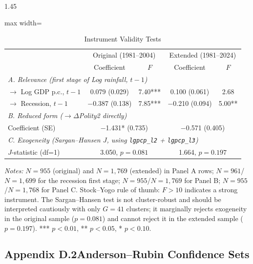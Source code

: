 \documentclass[12pt]{article}
\begin{document}
\begin{bibunit}[jpe]
\begin{spacing}{1.45}
\begin{table}[H]
\centering
\begin{adjustbox}{max width=\textwidth}
\begin{threeparttable}
\caption{Instrument Validity Tests}
\label{tab:D1}
\begin{tabular}{lcccc}
\toprule
 & \multicolumn{2}{c}{Original (1981--2004)} & \multicolumn{2}{c}{Extended (1981--2024)} \\
 & Coefficient & $F$ & Coefficient & $F$ \\
\midrule
\multicolumn{5}{l}{\textit{A. Relevance (first stage of Log rainfall, $t-1$)}} \\
$\to$ Log GDP p.c., $t-1$   & 0.079 (0.029) & 7.40*** & 0.100 (0.061) & 2.68 \\
$\to$ Recession, $t-1$      & $-$0.387 (0.138) & 7.85*** & $-$0.210 (0.094) & 5.00** \\
\midrule
\multicolumn{5}{l}{\textit{B. Reduced form ($\to\Delta$Polity2 directly)}} \\
Coefficient (SE)            & \multicolumn{2}{c}{$-$1.431* (0.735)} & \multicolumn{2}{c}{$-$0.571 (0.405)} \\
\midrule
\multicolumn{5}{l}{\textit{C. Exogeneity (Sargan--Hansen $J$, using \texttt{lgpcp\_l2} + \texttt{lgpcp\_l3})}} \\
$J$-statistic (df=1)        & \multicolumn{2}{c}{3.050, $p=0.081$} & \multicolumn{2}{c}{1.664, $p=0.197$} \\
\bottomrule
\end{tabular}
\begin{tablenotes}[flushleft]
\footnotesize
\item \textit{Notes:} $N=955$ (original) and $N=1{,}769$ (extended) in Panel A rows; $N=961$/$N=1{,}699$ for the recession first stage; $N=955$/$N=1{,}769$ for Panel B; $N=955$/$N=1{,}768$ for Panel C. Stock--Yogo \citep{stockyogo2005weak} rule of thumb: $F>10$ indicates a strong instrument. The Sargan--Hansen test is not cluster-robust and should be interpreted cautiously with only $G=41$ clusters; it marginally rejects exogeneity in the original sample ($p=0.081$) and cannot reject it in the extended sample ($p=0.197$). *** $p<0.01$, ** $p<0.05$, * $p<0.10$.
\end{tablenotes}
\end{threeparttable}
\end{adjustbox}
\end{table}

\subsection*{Appendix D.2\quad Anderson--Rubin Confidence Sets}


\end{spacing}
\end{bibunit}
\end{document}
